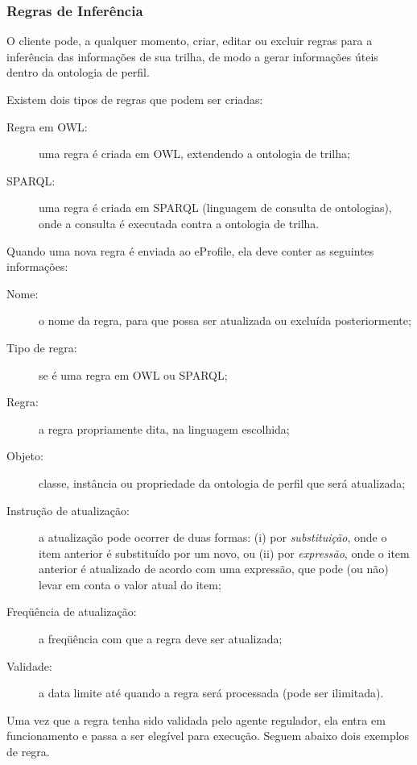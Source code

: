 \subsubsection{Regras de Inferência}

O cliente pode, a qualquer momento, criar, editar ou excluir regras para a inferência das informações de sua trilha, de modo a gerar informações úteis dentro da ontologia de perfil.

Existem dois tipos de regras que podem ser criadas:

\begin{description}

  \item[Regra em OWL:] uma regra é criada em OWL, extendendo a ontologia de trilha;

  \item[SPARQL:] uma regra é criada em SPARQL (linguagem de consulta de ontologias\cite{sparql}), onde a consulta é executada contra a ontologia de trilha.

\end{description}

Quando uma nova regra é enviada ao eProfile, ela deve conter as seguintes informações:

\begin{description}
  \item[Nome:] o nome da regra, para que possa ser atualizada ou excluída posteriormente;
  \item[Tipo de regra:] se é uma regra em OWL ou SPARQL;
  \item[Regra:] a regra propriamente dita, na linguagem escolhida;
  \item[Objeto:] classe, instância ou propriedade da ontologia de perfil que será atualizada;
  \item[Instrução de atualização:] a atualização pode ocorrer de duas formas: (i) por {\em substituição}, onde o item anterior é substituído por um novo, ou (ii) por {\em expressão}, onde o item anterior é atualizado de acordo com uma expressão, que pode (ou não) levar em conta o valor atual do item;
  \item[Freqüência de atualização:] a freqüência com que a regra deve ser atualizada;
  \item[Validade:] a data limite até quando a regra será processada (pode ser ilimitada).
\end{description}

Uma vez que a regra tenha sido validada pelo agente regulador, ela entra em funcionamento e passa a ser elegível para execução. Seguem abaixo dois exemplos de regra.

